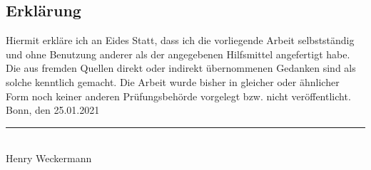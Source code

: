 \documentclass[a4paper]{book}
\def\autor{Henry Weckermann}
\begin{document}
\begin{large}

\section*{Erklärung}

Hiermit erkläre ich an Eides Statt, dass ich die vorliegende Arbeit
selbstständig und ohne Benutzung anderer als der angegebenen
Hilfsmittel angefertigt habe. Die aus fremden Quellen direkt oder
indirekt übernommenen Gedanken sind als solche kenntlich gemacht.  Die
Arbeit wurde bisher in gleicher oder ähnlicher Form noch keiner
anderen Prüfungsbehörde vorgelegt bzw. nicht veröffentlicht.\\

\vspace{1cm}
\noindent
Bonn, den 25.01.2021
\vspace{2cm}

\noindent
\rule{10cm}{0.1mm} \\
\autor\



\clearpage

\end{large}
\end{document}
